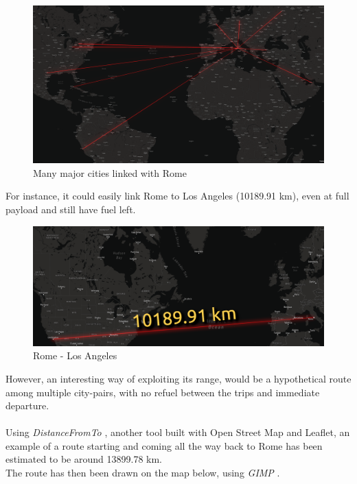 \documentclass{article}
\begin{document}
\begin{figure}[h!]
    \centering
    \includegraphics[width=\textwidth]{Sources/Plots_and_Pictures/worldwide_routes.png}
    \caption{Many major cities linked with Rome}
    \label{worldwide_maps}
\end{figure}
For instance, it could easily link Rome to Los Angeles (10189.91 km), even at full payload
and still have fuel left.
\begin{figure}[h!]
    \centering
    \includegraphics[width=\textwidth]{Sources/Plots_and_Pictures/rome_LA.png}
    \caption{Rome - Los Angeles}
    \label{rome_LA}
\end{figure}
\clearpage



However, an interesting way of exploiting its range, would be a hypothetical route among multiple city-pairs, with no
refuel between the trips and immediate departure. \\ \\ 
Using \textit{DistanceFromTo} \autocite{City_Distance_Calculator}, another tool built with Open Street Map and Leaflet, an example of
a route starting and coming all the way back to Rome has been estimated to be around 13899.78 km. \\ 
The route has then been drawn on the map below, using \textit{GIMP} \autocite{GIMP}. \\ 
\end{document}
